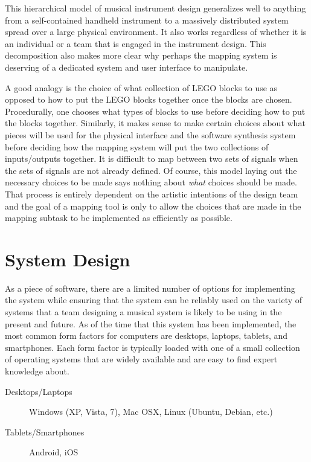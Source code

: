 This hierarchical model of musical instrument design generalizes well to anything from a self-contained handheld instrument to a massively distributed system spread over a large physical environment. It also works regardless of whether it is an individual or a team that is engaged in the instrument design. This decomposition also makes more clear why perhaps the mapping system is deserving of a dedicated system and user interface to manipulate. 

A good analogy is the choice of what collection of LEGO blocks to use as opposed to how to put the LEGO blocks together once the blocks are chosen. Procedurally, one chooses what types of blocks to use before deciding how to put the blocks together. Similarly, it makes sense to make certain choices about what pieces will be used for the physical interface and the software synthesis system before deciding how the mapping system will put the two collections of inputs/outputs together. It is difficult to map between two sets of signals when the sets of signals are not already defined. Of course, this model laying out the necessary choices to be made says nothing about \emph{what} choices should be made. That process is entirely dependent on the artistic intentions of the design team and the goal of a mapping tool is only to allow the choices that are made in the mapping subtask to be implemented as efficiently as possible.

\section{System Design}

As a piece of software, there are a limited number of options for implementing the system while ensuring that the system can be reliably used on the variety of systems that a team designing a musical system is likely to be using in the present and future. As of the time that this system has been implemented, the most common form factors for computers are desktops, laptops, tablets, and smartphones. Each form factor is typically loaded with one of a small collection of operating systems that are widely available and are easy to find expert knowledge about.

\begin{description}
\item[Desktops/Laptops] Windows (XP, Vista, 7), Mac OSX, Linux (Ubuntu, Debian, etc.)
\item[Tablets/Smartphones] Android, iOS
\end{description}

